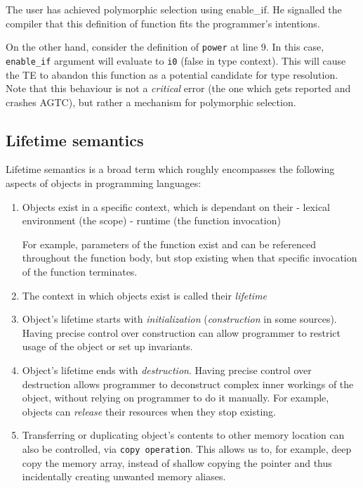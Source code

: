 \documentclass[times, utf8, diplomski]{fer}
\theoremstyle{definition}
\begin{document}
The user has achieved polymorphic selection using enable\_if. He signalled the compiler that this
definition of  function fits the programmer's intentions.

On the other hand, consider the definition of \texttt{power} at line 9.
In this case, \texttt{enable\_if} argument will evaluate to \texttt{i0} (false in type context).
This will cause the TE to abandon this function as a potential candidate for type resolution.
Note that this behaviour is not a \textit{critical} error (the one which gets reported and crashes AGTC),
but rather a mechanism for polymorphic selection.

\subsection{Lifetime semantics}

Lifetime semantics is a broad term which roughly encompasses the following aspects of objects
in programming languages:

\begin{enumerate}
    \item Objects exist in a specific context, which is dependant on their 
        \subitem - lexical environment (the scope)
        \subitem - runtime (the function invocation)

        For example, parameters of the function exist and can be referenced throughout the function body,
        but stop existing when that specific invocation of the function terminates. 

    \item The context in which objects exist is called their \textit{lifetime}
    \item Object's lifetime starts with \textit{initialization} (\textit{construction} in some sources).
        Having precise control over construction can allow programmer
                to restrict usage of the object or set up invariants.
    \item Object's lifetime ends with \textit{destruction}.
        Having precise control over destruction allows programmer to
        deconstruct complex inner workings of the object, without relying on programmer to do it manually.
        For example, objects can \textit{release} their resources when they stop existing.
    \item Transferring or duplicating object's contents to other memory location can also be controlled,
        via \texttt{copy operation}. This allows us to, for example, deep copy the memory array, 
        instead of shallow copying the pointer and thus incidentally creating unwanted memory aliases.
\end{enumerate}
\end{document}
